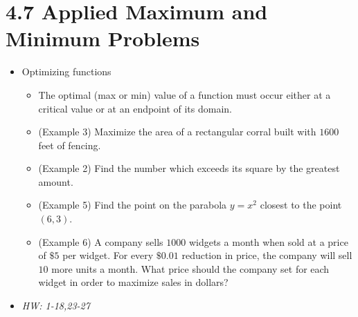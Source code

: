 \documentclass[11pt]{article}
\begin{document}
\section*{4.7 Applied Maximum and Minimum Problems}

\begin{itemize}
\item Optimizing functions
  \begin{itemize}
    \item The optimal (max or min) value of a function must occur either
          at a critical value or at an endpoint of its domain.
    \item (Example 3) Maximize the area of a rectangular corral built with
          \(1600\) feet of fencing.
    \item (Example 2) Find the number which exceeds its square by the greatest
          amount.
    \item (Example 5) Find the point on the parabola \(y=x^2\) closest to
          the point \((6,3)\).
    \item (Example 6) A company sells \(1000\) widgets a month when sold at
          a price of \(\$5\) per widget. For every \(\$0.01\) reduction in
          price, the company will sell \(10\) more units a month. What price
          should the company set for each widget in order to maximize sales
          in dollars?
  \end{itemize}
\item\textit{
  HW: 1-18,23-27
}
\end{itemize}
\end{document}

